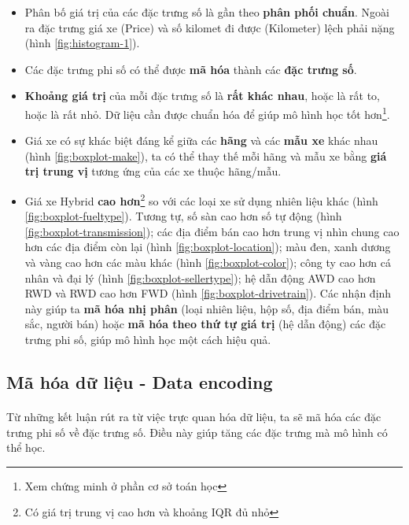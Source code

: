 \begin{itemize}
    \item Phân bố giá trị của các đặc trưng số là gần theo \textbf{phân phối chuẩn}. Ngoài ra đặc trưng giá xe (Price) và số kilomet đi được (Kilometer) lệch phải nặng (hình \ref{fig:histogram-1}). 
    \item Các đặc trưng phi số có thể được \textbf{mã hóa} thành các \textbf{đặc trưng số}.
    \item \textbf{Khoảng giá trị} của mỗi đặc trưng số là \textbf{rất khác nhau}, hoặc là rất to, hoặc là rất nhỏ. Dữ liệu cần được chuẩn hóa để giúp mô hình học tốt hơn\footnote{Xem chứng minh ở phần cơ sở toán học}.
    \item Giá xe có sự khác biệt đáng kể giữa các \textbf{hãng} và các \textbf{mẫu xe} khác nhau (hình \ref{fig:boxplot-make}), ta có thể thay thế mỗi hãng và mẫu xe bằng \textbf{giá trị trung vị} tương ứng của các xe thuộc hãng/mẫu.
    \item Giá xe Hybrid \textbf{cao hơn}\footnote{Có giá trị trung vị cao hơn và khoảng IQR đủ nhỏ} so với các loại xe sử dụng nhiên liệu khác (hình \ref{fig:boxplot-fueltype}). Tương tự, số sàn cao hơn số tự động (hình \ref{fig:boxplot-transmission}); các địa điểm bán cao hơn trung vị nhìn chung cao hơn các địa điểm còn lại (hình \ref{fig:boxplot-location}); màu đen, xanh dương và vàng cao hơn các màu khác (hình \ref{fig:boxplot-color}); công ty cao hơn cá nhân và đại lý (hình \ref{fig:boxplot-sellertype}); hệ dẫn động AWD cao hơn RWD và RWD cao hơn FWD (hình \ref{fig:boxplot-drivetrain}). Các nhận định này giúp ta \textbf{mã hóa nhị phân} (loại nhiên liệu, hộp số, địa điểm bán, màu sắc, người bán) hoặc \textbf{mã hóa theo thứ tự giá trị} (hệ dẫn động) các đặc trưng phi số, giúp mô hình học một cách hiệu quả.
\end{itemize}

\subsection{Mã hóa dữ liệu - Data encoding}
\paragraph{}{Từ những kết luận rút ra từ việc trực quan hóa dữ liệu, ta sẽ mã hóa các đặc trưng phi số về đặc trưng số. Điều này giúp tăng các đặc trưng mà mô hình có thể học.}

